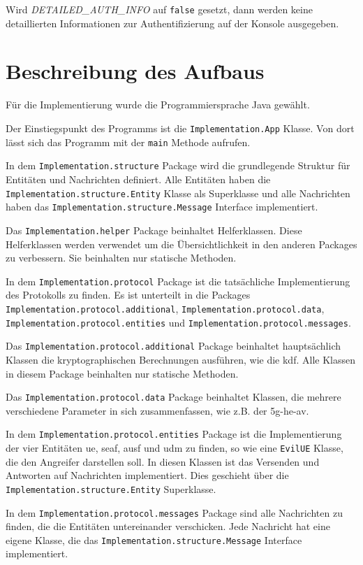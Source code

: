 Wird \textit{DETAILED\_AUTH\_INFO} auf \lstinline{false} gesetzt, dann werden keine detaillierten Informationen zur Authentifizierung auf der Konsole ausgegeben.


\section{Beschreibung des Aufbaus}
Für die Implementierung wurde die Programmiersprache Java gewählt.

Der Einstiegspunkt des Programms ist die \lstinline{Implementation.App} Klasse. Von dort lässt sich das Programm mit der \lstinline{main} Methode aufrufen.

In dem \lstinline{Implementation.structure} Package wird die grundlegende Struktur für Entitäten und Nachrichten definiert.
Alle Entitäten haben die \lstinline{Implementation.structure.Entity} Klasse als Superklasse und alle Nachrichten haben das \lstinline{Implementation.structure.Message} Interface implementiert.

Das \lstinline{Implementation.helper} Package beinhaltet Helferklassen.
Diese Helferklassen werden verwendet um die Übersichtlichkeit in den anderen Packages zu verbessern.
Sie beinhalten nur statische Methoden.

In dem \lstinline{Implementation.protocol} Package ist die tatsächliche Implementierung des Protokolls zu finden.
Es ist unterteilt in die Packages \lstinline{Implementation.protocol.additional}, \lstinline{Implementation.protocol.data}, \lstinline{Implementation.protocol.entities} und \lstinline{Implementation.protocol.messages}.

Das \lstinline{Implementation.protocol.additional} Package beinhaltet hauptsächlich Klassen die kryptographischen Berechnungen ausführen, wie die \gls{kdf}.
Alle Klassen in diesem Package beinhalten nur statische Methoden.

Das \lstinline{Implementation.protocol.data} Package beinhaltet Klassen, die mehrere verschiedene Parameter in sich zusammenfassen, wie z.B. der \gls{5g-he-av}.

In dem \lstinline{Implementation.protocol.entities} Package ist die Implementierung der vier Entitäten \gls{ue}, \gls{seaf}, \gls{ausf} und \gls{udm} zu finden, so wie eine \lstinline{EvilUE} Klasse, die den Angreifer darstellen soll.
In diesen Klassen ist das Versenden und Antworten auf Nachrichten implementiert.
Dies geschieht über die \lstinline{Implementation.structure.Entity} Superklasse.

In dem \lstinline{Implementation.protocol.messages} Package sind alle Nachrichten zu finden, die die Entitäten untereinander verschicken.
Jede Nachricht hat eine eigene Klasse, die das \lstinline{Implementation.structure.Message} Interface implementiert.

